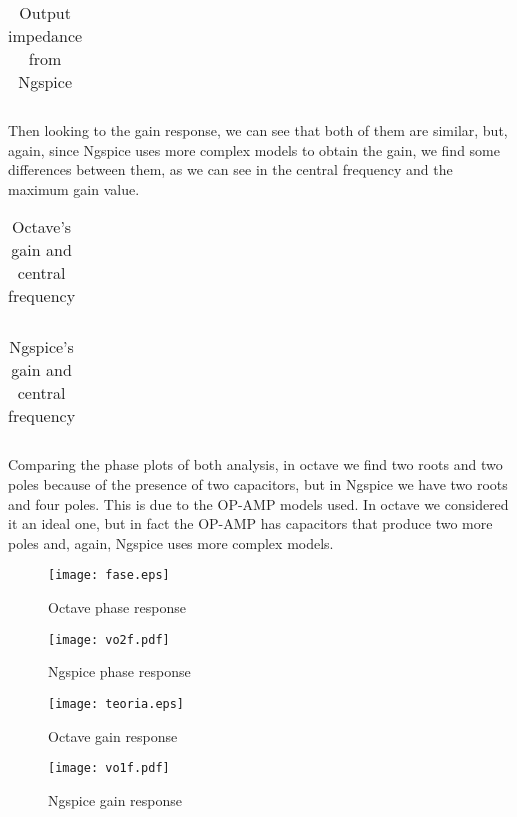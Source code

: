 \begin{table}[H]
\centering
\begin{tabularx}{0.6\textwidth} {
  | >{\raggedright\arraybackslash}X
  | >{\raggedleft\arraybackslash}X | }
 \hline

\end{tabularx}
\caption{Output impedance from Ngspice}
\label{tab18}
\end{table}





Then looking to the gain response, we can see that both of them are similar, but, again, since Ngspice uses more complex models to obtain the gain, we find some differences between them, as we can see in the central frequency and the maximum gain value.

\begin{table}[H]
\centering
\begin{tabularx}{0.6\textwidth} {
  | >{\raggedright\arraybackslash}X
  | >{\raggedleft\arraybackslash}X | }
 \hline

\end{tabularx}
\caption{Octave's gain and central frequency}
\end{table}


\begin{table}[H]
\centering
\begin{tabularx}{0.6\textwidth} {
  | >{\raggedright\arraybackslash}X
  | >{\raggedleft\arraybackslash}X | }
 \hline

\end{tabularx}
\caption{Ngspice's gain and central frequency}
\label{tab16}
\end{table}

Comparing the phase plots of both analysis, in octave we find two roots and two poles because of the presence of two capacitors, but in Ngspice we have two roots and four poles. This is due to the OP-AMP models used. In octave we considered it an ideal one, but in fact the OP-AMP has capacitors that produce two more poles and, again, Ngspice uses more complex models.

\begin{figure}[H] \centering
\texttt{[image: fase.eps]}
\caption{Octave phase response}
\end{figure}

\begin{figure}[H] \centering
\texttt{[image: vo2f.pdf]}
\caption{Ngspice phase response}
\end{figure}

\begin{figure}[H] \centering
\texttt{[image: teoria.eps]}
\caption{Octave gain response}
\end{figure}

\begin{figure}[H] \centering
\texttt{[image: vo1f.pdf]}
\caption{Ngspice gain response}
\end{figure}

